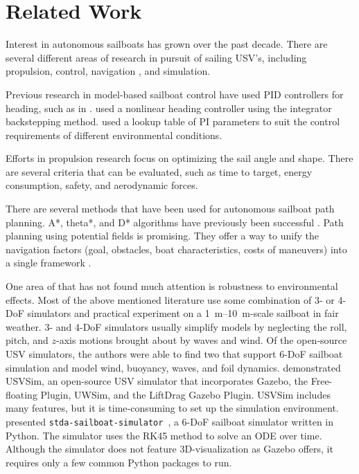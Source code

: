 \documentclass[conference]{IEEEtran}
\newcommand{\Sim}{\lstinline{stda-sailboat-simulator}\ }
\begin{document}
\section{Related Work}
Interest in autonomous sailboats has grown over the past decade. There are several different areas of research in pursuit of sailing USV's, including propulsion, control, navigation , and simulation.



Previous research in model-based sailboat control have used PID controllers for heading, such as in \cite{Cruz2010, Erckens2010}. \cite{Xiao2014} used a nonlinear heading controller using the integrator backstepping method. \cite{Santos2018} used a lookup table of PI parameters to suit the control requirements of different environmental conditions.

Efforts in propulsion research \cite{Saoud2015, Setiawan2019, DosSantos2020} focus on optimizing the sail angle and shape. There are several criteria that can be evaluated, such as time to target, energy consumption, safety, and aerodynamic forces.

There are several methods that have been used for autonomous sailboat path planning. A*, theta*, and D* algorithms have previously been successful \cite{Erckens2010}. Path planning using potential fields is promising. They offer a way to unify the navigation factors (goal, obstacles, boat characteristics, costs of maneuvers) into a single framework \cite{Plumet2013}. 

One area of that has not found much attention is robustness to environmental effects. Most of the above mentioned literature use some combination of 3- or 4-DoF simulators and practical experiment on a \SIrange{1}{10}{\meter}-scale sailboat in fair weather. 3- and 4-DoF simulators usually simplify models by neglecting the roll, pitch, and \(z\)-axis motions brought about by waves and wind. Of the open-source USV simulators, the authors were able to find two that support 6-DoF sailboat simulation and model wind, buoyancy, waves, and foil dynamics. \cite{Paravisi2019} demonstrated USVSim, an open-source USV simulator that incorporates Gazebo, the Free-floating Plugin, UWSim, and the LiftDrag Gazebo Plugin. USVSim includes many features, but it is time-consuming to set up the simulation environment. \cite{Buehler2018} presented \Sim, a 6-DoF sailboat simulator written in Python. The simulator uses the RK45 method to solve an ODE over time. Although the simulator does not feature 3D-visualization as Gazebo offers, it requires only a few common Python packages to run.
\end{document}
